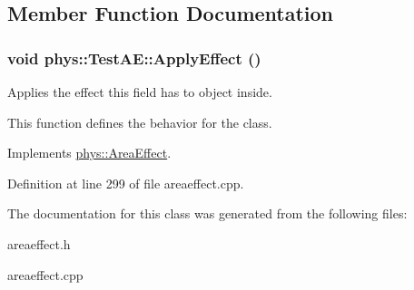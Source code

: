 \subsection{Member Function Documentation}
\hypertarget{classphys_1_1TestAE_a191c60dbfa277e850ea392d9ab774c42}{
\subsubsection[{ApplyEffect}]{\setlength{\rightskip}{0pt plus 5cm}void phys::TestAE::ApplyEffect ()}}
\label{d1/dca/classphys_1_1TestAE_a191c60dbfa277e850ea392d9ab774c42}


Applies the effect this field has to object inside. 

This function defines the behavior for the class. 

Implements \hyperlink{classphys_1_1AreaEffect_a3b285ecfcf9c9200662d510e48dd222a}{phys::AreaEffect}.



Definition at line 299 of file areaeffect.cpp.



The documentation for this class was generated from the following files:\begin{DoxyCompactItemize}
\item 
areaeffect.h\item 
areaeffect.cpp\end{DoxyCompactItemize}
